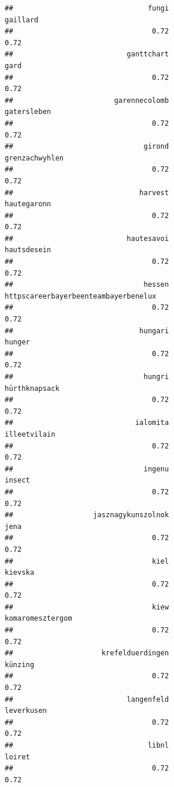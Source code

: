 \documentclass[
]{article}
\begin{document}
\begin{verbatim}
##                                fungi                             gaillard 
##                                 0.72                                 0.72 
##                           ganttchart                                 gard 
##                                 0.72                                 0.72 
##                        garennecolomb                          gatersleben 
##                                 0.72                                 0.72 
##                               girond                       grenzachwyhlen 
##                                 0.72                                 0.72 
##                              harvest                          hautegaronn 
##                                 0.72                                 0.72 
##                           hautesavoi                          hautsdesein 
##                                 0.72                                 0.72 
##                               hessen httpscareerbayerbeenteambayerbenelux 
##                                 0.72                                 0.72 
##                              hungari                               hunger 
##                                 0.72                                 0.72 
##                               hungri                        hürthknapsack 
##                                 0.72                                 0.72 
##                             ialomita                         illeetvilain 
##                                 0.72                                 0.72 
##                               ingenu                               insect 
##                                 0.72                                 0.72 
##                   jasznagykunszolnok                                 jena 
##                                 0.72                                 0.72 
##                                 kiel                              kievska 
##                                 0.72                                 0.72 
##                                 kiew                     komaromesztergom 
##                                 0.72                                 0.72 
##                     krefelduerdingen                              künzing 
##                                 0.72                                 0.72 
##                           langenfeld                           leverkusen 
##                                 0.72                                 0.72 
##                                libnl                               loiret 
##                                 0.72                                 0.72 

\end{verbatim}
\end{document}

